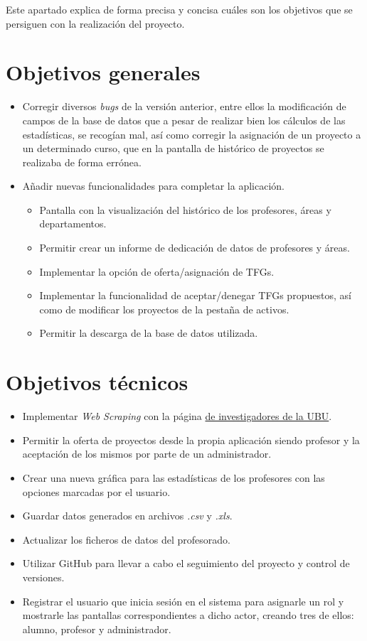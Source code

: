 
Este apartado explica de forma precisa y concisa cuáles son los objetivos que se persiguen con la realización del proyecto.

\section{Objetivos generales}
\begin{itemize}
	\item Corregir diversos \emph{bugs} de la versión anterior, entre ellos la modificación de campos de la base de datos que a pesar de realizar bien los cálculos de las estadísticas, se recogían mal, así como corregir la asignación de un proyecto a un determinado curso, que en la pantalla de histórico de proyectos se realizaba de forma errónea.
	\item Añadir nuevas funcionalidades para completar la aplicación.
		\begin{itemize}
			\item Pantalla con la visualización del histórico de los profesores, áreas y departamentos.
			\item Permitir crear un informe de dedicación de datos de profesores y áreas.
			\item Implementar la opción de oferta/asignación de TFGs.
			\item Implementar la funcionalidad de aceptar/denegar TFGs propuestos, así como de modificar los proyectos de la pestaña de activos.
			\item Permitir la descarga de la base de datos utilizada.
			
		\end{itemize}

	
\end{itemize}
\section{Objetivos técnicos}
\begin{itemize}
	\item Implementar \emph{Web Scraping} con la página \href{https://investigacion.ubu.es/unidades/2682/investigadores}{de investigadores de la UBU}.
	\item Permitir la oferta de proyectos desde la propia aplicación siendo profesor y la aceptación de los mismos por parte de un administrador.
	\item Crear una nueva gráfica para las estadísticas de los profesores con las opciones marcadas por el usuario.
	\item Guardar datos generados en archivos \emph{.csv} y \emph{.xls}.
	\item Actualizar los ficheros de datos del profesorado.
	\item Utilizar GitHub para llevar a cabo el seguimiento del proyecto y control de versiones.
	\item Registrar el usuario que inicia sesión en el sistema para asignarle un rol y mostrarle las pantallas correspondientes a dicho actor, creando tres de ellos: alumno, profesor y administrador.
\end{itemize}